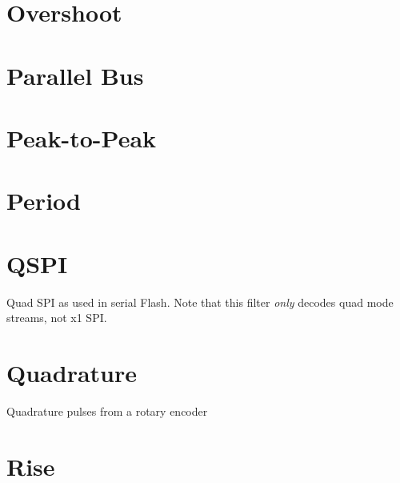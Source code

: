 \section{Overshoot}

\pagebreak
\section{Parallel Bus}

\pagebreak
\section{Peak-to-Peak}

\pagebreak
\section{Period}

\pagebreak
\section{QSPI}

Quad SPI as used in serial Flash. Note that this filter \emph{only} decodes quad mode streams, not x1 SPI.

\pagebreak
\section{Quadrature}

Quadrature pulses from a rotary encoder

\pagebreak
\section{Rise}

\pagebreak
